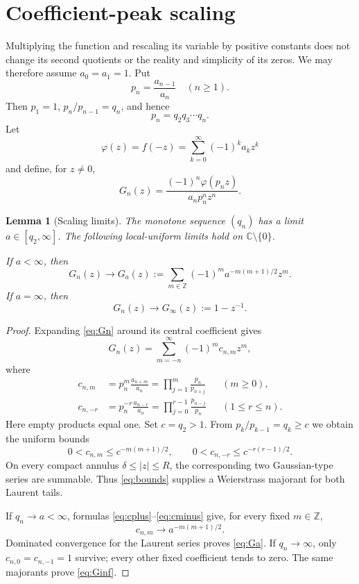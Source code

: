 \documentclass[11pt]{article}
\newtheorem{lemma}{Lemma}
\newcommand{\C}{\mathbb C}
\newcommand{\Z}{\mathbb Z}
\begin{document}
\section{Coefficient-peak scaling}

Multiplying the function and rescaling its variable by positive constants
does not change its second quotients or the reality and simplicity of its
zeros.  We may therefore assume $a_0=a_1=1$.  Put
\[
 p_n=\frac{a_{n-1}}{a_n}\quad(n\geq1).
\]
Then $p_1=1$, $p_n/p_{n-1}=q_n$, and hence
\begin{equation}\label{eq:pn}
 p_n=q_2q_3\cdots q_n.
\end{equation}
Let
\[
 \varphi(z)=f(-z)=\sum_{k=0}^{\infty}(-1)^ka_kz^k
\]
and define, for $z\ne0$,
\begin{equation}\label{eq:Gn}
 G_n(z)=\frac{(-1)^n\varphi(p_nz)}{a_np_n^nz^n}.
\end{equation}

\begin{lemma}[Scaling limits]\label{lem:limit}
The monotone sequence $(q_n)$ has a limit $a\in[q_2,\infty]$.  The following local-uniform
limits hold on $\C\setminus\{0\}$.

If $a<\infty$, then
\begin{equation}\label{eq:Ga}
 G_n(z)\longrightarrow
 G_a(z):=\sum_{m\in\Z}(-1)^m a^{-m(m+1)/2}z^m.
\end{equation}
If $a=\infty$, then
\begin{equation}\label{eq:Ginf}
 G_n(z)\longrightarrow G_\infty(z):=1-z^{-1}.
\end{equation}
\end{lemma}

\begin{proof}
Expanding \eqref{eq:Gn} around its central coefficient gives
\[
 G_n(z)=\sum_{m=-n}^{\infty}(-1)^m c_{n,m}z^m,
\]
where
\begin{align}
 c_{n,m}&=p_n^m\frac{a_{n+m}}{a_n}
 =\prod_{j=1}^{m}\frac{p_n}{p_{n+j}} &&(m\geq0),\label{eq:cplus}\\
 c_{n,-r}&=p_n^{-r}\frac{a_{n-r}}{a_n}
 =\prod_{j=0}^{r-1}\frac{p_{n-j}}{p_n} &&(1\leq r\leq n).
 \label{eq:cminus}
\end{align}
Here empty products equal one.  Set $c=q_2>1$.  From
$p_{k}/p_{k-1}=q_k\geq c$ we obtain the uniform bounds
\begin{equation}\label{eq:bounds}
 0<c_{n,m}\leq c^{-m(m+1)/2},\qquad
 0<c_{n,-r}\leq c^{-r(r-1)/2}.
\end{equation}
On every compact annulus $\delta\leq|z|\leq R$, the corresponding two
Gaussian-type series are summable.  Thus \eqref{eq:bounds} supplies a
Weierstrass majorant for both Laurent tails.

If $q_n\to a<\infty$, formulas \eqref{eq:cplus}--\eqref{eq:cminus}
give, for every fixed $m\in\Z$,
\[
 c_{n,m}\longrightarrow a^{-m(m+1)/2}.
\]
Dominated convergence for the Laurent series proves \eqref{eq:Ga}.  If
$q_n\to\infty$, only $c_{n,0}=c_{n,-1}=1$ survive; every other fixed
coefficient tends to zero.  The same majorants prove \eqref{eq:Ginf}.
\end{proof}
\end{document}
